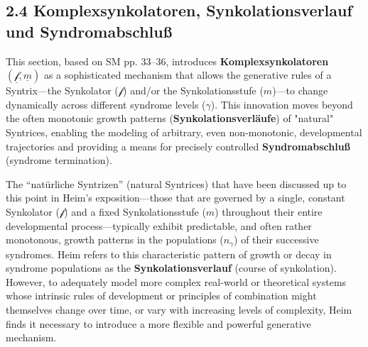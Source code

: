 \documentclass[12pt]{article}
\newcommand{\q}[1]{\enquote{#1}}
\newcommand{\synkolator}{\mathcal{f}}
\newcommand{\synkolationsstufe}{m}
\begin{document}
\subsection{2.4 Komplexsynkolatoren, Synkolationsverlauf und Syndromabschluß}
\label{sec:komplexsynkolatoren}

This section, based on SM pp. 33--36, introduces \textbf{Komplexsynkolatoren} \( (\underline{\synkolator}, \underline{\synkolationsstufe}) \) as a sophisticated mechanism that allows the generative rules of a Syntrix—the Synkolator (\(\synkolator\)) and/or the Synkolationsstufe (\(\synkolationsstufe\))—to change dynamically across different syndrome levels (\(\gamma\)). This innovation moves beyond the often monotonic growth patterns (\textbf{Synkolationsverläufe}) of "natural" Syntrices, enabling the modeling of arbitrary, even non-monotonic, developmental trajectories and providing a means for precisely controlled \textbf{Syndromabschluß} (syndrome termination).

The \q{natürliche Syntrizen} (natural Syntrices) that have been discussed up to this point in Heim's exposition—those that are governed by a single, constant Synkolator (\( \synkolator \)) and a fixed Synkolationsstufe (\( \synkolationsstufe \)) throughout their entire developmental process—typically exhibit predictable, and often rather monotonous, growth patterns in the populations (\( n_\gamma \)) of their successive syndromes. Heim refers to this characteristic pattern of growth or decay in syndrome populations as the \textbf{Synkolationsverlauf} (course of synkolation). However, to adequately model more complex real-world or theoretical systems whose intrinsic rules of development or principles of combination might themselves change over time, or vary with increasing levels of complexity, Heim finds it necessary to introduce a more flexible and powerful generative mechanism.
\end{document}
